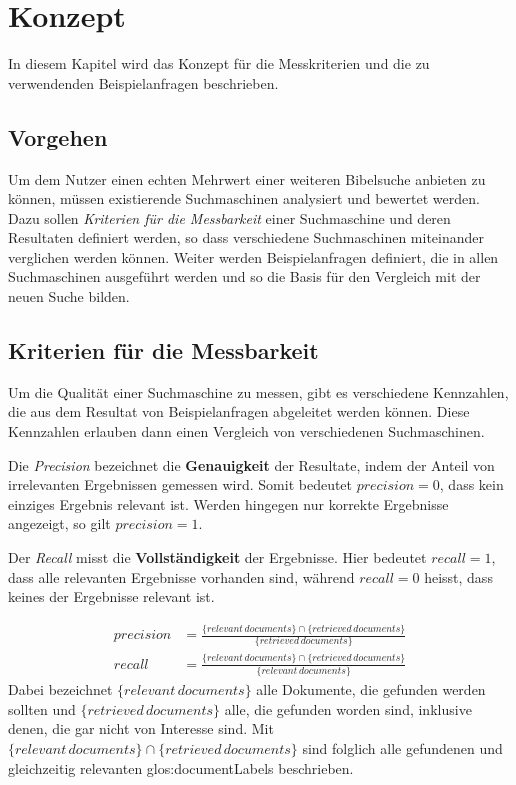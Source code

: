 \chapter{Konzept}
In diesem Kapitel wird das Konzept für die Messkriterien und die zu verwendenden Beispielanfragen beschrieben.

\section{Vorgehen}
Um dem Nutzer einen echten Mehrwert einer weiteren Bibelsuche anbieten zu können, müssen existierende Suchmaschinen analysiert und bewertet werden.
Dazu sollen \textit{Kriterien für die Messbarkeit} einer Suchmaschine und deren Resultaten definiert werden, so dass verschiedene Suchmaschinen miteinander verglichen werden können.
Weiter werden Beispielanfragen definiert, die in allen Suchmaschinen ausgeführt werden und so die Basis für den Vergleich mit der neuen Suche bilden.

\section{Kriterien für die Messbarkeit}
Um die Qualität einer Suchmaschine zu messen, gibt es verschiedene Kennzahlen, die aus dem Resultat von Beispielanfragen abgeleitet werden können.
Diese Kennzahlen erlauben dann einen Vergleich von verschiedenen Suchmaschinen.

Die \textit{Precision} bezeichnet die \textbf{Genauigkeit} der Resultate, indem der Anteil von irrelevanten Ergebnissen gemessen wird.
Somit bedeutet $precision = 0$, dass kein einziges Ergebnis relevant ist.
Werden hingegen nur korrekte Ergebnisse angezeigt, so gilt $precision = 1$.

Der \textit{Recall} misst die \textbf{Vollständigkeit} der Ergebnisse. Hier bedeutet $recall = 1$, dass alle relevanten Ergebnisse vorhanden sind, während $recall = 0$ heisst, dass keines der Ergebnisse relevant ist.

\begin{align}
	precision & = \frac{\{relevant \, documents\} \cap \{retrieved \, documents\}}{\{retrieved \, documents\}} \\
	recall & = \frac{\{relevant \, documents\} \cap \{retrieved \, documents\}}{\{relevant \, documents\}}
\end{align}
Dabei bezeichnet $\{relevant \, documents\}$ alle Dokumente, die gefunden werden sollten und $\{retrieved \, documents\}$ alle, die gefunden worden sind, inklusive denen, die gar nicht von Interesse sind.
Mit $\{relevant \, documents\} \cap \{retrieved \, documents\}$ sind folglich alle gefundenen und gleichzeitig relevanten \glspl{glos:documentLabel} beschrieben.

